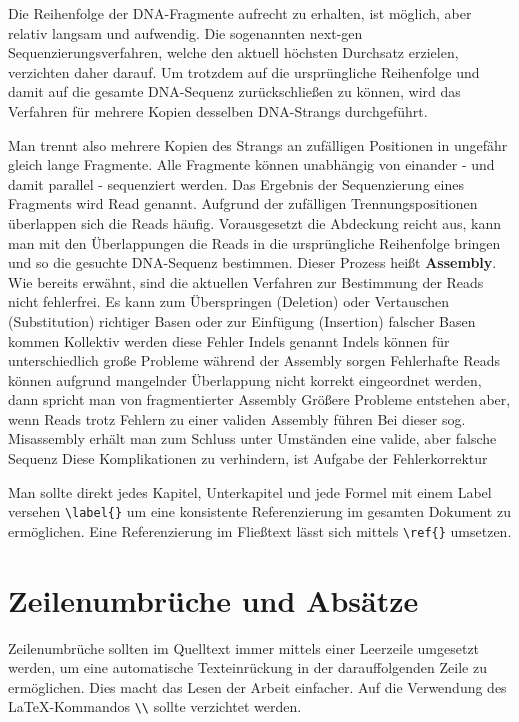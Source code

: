 Die Reihenfolge der DNA-Fragmente aufrecht zu erhalten, ist möglich, aber relativ langsam und aufwendig.
Die sogenannten next-gen Sequenzierungsverfahren, welche den aktuell höchsten Durchsatz erzielen, verzichten daher darauf.
Um trotzdem auf die ursprüngliche Reihenfolge und damit auf die gesamte DNA-Sequenz zurückschließen zu können, wird das Verfahren für mehrere Kopien desselben DNA-Strangs durchgeführt.

Man trennt also mehrere Kopien des Strangs an zufälligen Positionen in ungefähr gleich lange Fragmente.
Alle Fragmente können unabhängig von einander - und damit parallel - sequenziert werden.
Das Ergebnis der Sequenzierung eines Fragments wird Read genannt.
Aufgrund der zufälligen Trennungspositionen überlappen sich die Reads häufig.
Vorausgesetzt die Abdeckung reicht aus, kann man mit den Überlappungen die Reads in die ursprüngliche Reihenfolge bringen und so die gesuchte DNA-Sequenz bestimmen.
Dieser Prozess heißt \textbf{Assembly}.
Wie bereits erwähnt, sind die aktuellen Verfahren zur Bestimmung der Reads nicht fehlerfrei.
Es kann zum Überspringen (Deletion) oder Vertauschen (Substitution) richtiger Basen oder zur Einfügung (Insertion) falscher Basen kommen
Kollektiv werden diese Fehler Indels genannt
Indels können für unterschiedlich große Probleme während der Assembly sorgen
Fehlerhafte Reads können aufgrund mangelnder Überlappung nicht korrekt eingeordnet werden, dann spricht man von fragmentierter Assembly
Größere Probleme entstehen aber, wenn Reads trotz Fehlern zu einer validen Assembly führen
Bei dieser sog. Misassembly erhält man zum Schluss unter Umständen eine valide, aber falsche Sequenz
Diese Komplikationen zu verhindern, ist Aufgabe der Fehlerkorrektur



Man sollte direkt jedes Kapitel, Unterkapitel und jede Formel mit einem Label versehen \verb+\label{}+ um eine konsistente Referenzierung im gesamten Dokument zu ermöglichen. Eine Referenzierung im Fließtext lässt sich mittels \verb+\ref{}+ umsetzen.


\section{Zeilenumbrüche und Absätze}
\label{s:zeilenumbruch} 
Zeilenumbrüche sollten im Quelltext immer mittels einer Leerzeile umgesetzt werden, um eine automatische Texteinrückung in der darauffolgenden Zeile zu ermöglichen. Dies macht das Lesen der Arbeit einfacher. Auf die Verwendung des LaTeX-Kommandos \verb+\\+ sollte verzichtet werden.


